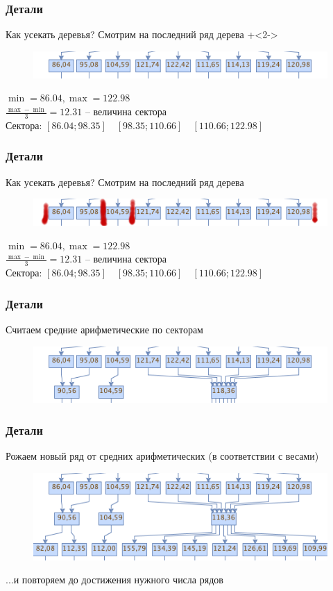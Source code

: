\documentclass[unicode, notheorems]{beamer}
\begin{document}
  \begin{frame}
    \frametitle{Детали}
    \alert{Как усекать деревья?}
    Смотрим на последний ряд дерева
    \onslide+<2->
    \begin{figure}[h]
      \includegraphics[width=0.8\linewidth]{tree_row}
      \label{fig:linearTree}
    \end{figure}
    $\min = 86.04, \max = 122.98$ \\
    $\frac{\max - \min}{3} = 12.31$ -- величина сектора\\
    Сектора: $[86.04;98.35]\quad[98.35;110.66]\quad[110.66;122.98]$

  \end{frame}

  \begin{frame}
    \frametitle{Детали}
    \alert{Как усекать деревья?}
    Смотрим на последний ряд дерева
    \begin{figure}[h]
      \includegraphics[width=0.8\linewidth]{tree_row_sectorized}
    \end{figure}
    $\min = 86.04, \max = 122.98$ \\
    $\frac{\max - \min}{3} = 12.31$ -- величина сектора\\
    Сектора: $[86.04;98.35]\quad[98.35;110.66]\quad[110.66;122.98]$

  \end{frame}
  
  \begin{frame}
    \frametitle{Детали}
    Считаем средние арифметические по секторам
    \begin{figure}[h]
      \includegraphics[width=0.8\linewidth]{tree_row_means}
    \end{figure}
  \end{frame}
  
  \begin{frame}
    \frametitle{Детали}
    Рожаем новый ряд от средних арифметических (в соответствии с весами)
    \begin{figure}[h]
      \includegraphics[width=0.8\linewidth]{tree_row_new_generation}
    \end{figure}
    ...и повторяем до достижения нужного числа рядов
  \end{frame}
\end{document}
